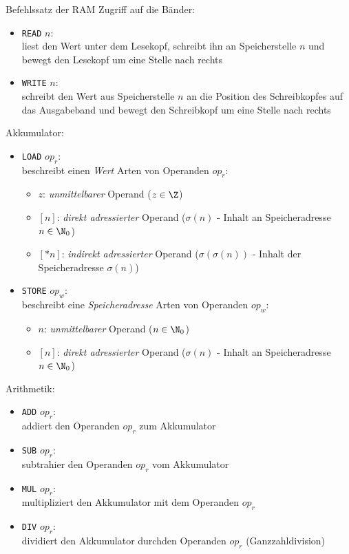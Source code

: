\documentclass[german]{spicker}
\begin{document}
\begin{defi}{Befehlssatz der RAM}
  Zugriff auf die Bänder:
  \begin{itemize}
    \item \texttt{READ} $n$: \\
          liest den Wert unter dem Lesekopf, schreibt ihn an Speicherstelle $n$ und bewegt den Lesekopf um eine Stelle nach rechts
    \item \texttt{WRITE} $n$: \\
          schreibt den Wert aus Speicherstelle $n$ an die Position des Schreibkopfes auf das Ausgabeband und bewegt den Schreibkopf um eine Stelle nach rechts
  \end{itemize}

  Akkumulator:
  \begin{itemize}
    \item \texttt{LOAD} $op_r$: \\
          beschreibt einen \emph{Wert}
          \subitem Arten von Operanden $op_r$:
          \begin{itemize}
            \item $z$: \emph{unmittelbarer} Operand ($z \in \Z$)
            \item $[n]$: \emph{direkt adressierter} Operand ($\sigma(n)$ - Inhalt an Speicheradresse $n\in \N_0$)
            \item $[*n]$: \emph{indirekt adressierter} Operand ($\sigma(\sigma(n))$ - Inhalt der Speicheradresse $\sigma(n)$)
          \end{itemize}
  \end{itemize}

  \begin{itemize}
    \item \texttt{STORE} $op_w$: \\
          beschreibt eine \emph{Speicheradresse}
          \subitem Arten von Operanden $op_w$:
          \begin{itemize}
            \item $n$: \emph{unmittelbarer} Operand ($n \in \N_0$)
            \item $[n]$: \emph{direkt adressierter} Operand ($\sigma(n)$ - Inhalt an Speicheradresse $n\in \N_0$)
          \end{itemize}
  \end{itemize}

  Arithmetik:
  \begin{itemize}
    \item \texttt{ADD} $op_r$: \\
          addiert den Operanden $op_r$ zum Akkumulator
    \item \texttt{SUB} $op_r$: \\
          subtrahier den Operanden $op_r$ vom Akkumulator
    \item \texttt{MUL} $op_r$: \\
          multipliziert den Akkumulator mit dem Operanden $op_r$
    \item \texttt{DIV} $op_r$: \\
          dividiert den Akkumulator durchden Operanden $op_r$ (Ganzzahldivision)
  \end{itemize}


\end{defi}
\end{document}
